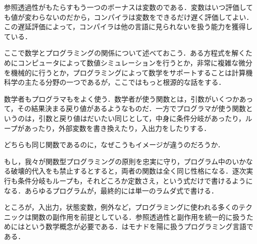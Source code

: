 \documentclass[a5paper,twoside,fleqn,draft]{jsbook}
\begin{document}
参照透過性がもたらすもう一つのボーナスは変数のである．変数はいつ評価しても値が変わらないのだから，コンパイラは変数をできるだけ遅く評価してよい．この遅延評価によって，\haskell コンパイラは他の言語に見られないを扱う能力を獲得している．

\separator

ここで数学とプログラミングの関係について述べておこう．ある方程式を解くためにコンピュータによって数値シミュレーションを行うとか，非常に複雑な微分を機械的に行うとか，プログラミングによって数学をサポートすることは計算機科学の主たる分野の一つであるが，ここではもっと根源的な話をする．

数学者もプログラマもをよく使う．数学者が使う関数とは，引数がいくつかあって，その結果決まる戻り値があるようなものだ．一方でプログラマが使う関数というのは，引数と戻り値はだいたい同じとして，中身に条件分岐があったり，ループがあったり，外部変数を書き換えたり，入出力をしたりする．

どちらも同じ関数であるのに，なぜこうもイメージが違うのだろうか．

もし，我々が関数型プログラミングの原則を忠実に守り，プログラム中のいかなる破壊的代入をも禁止するとすると，両者の関数は全く同じ性格になる．逐次実行も条件分岐もループも，それどころか定数さえ，という式だけで書けるようになる．あらゆるプログラムが，最終的には単一のラムダ式で書ける．

ところが，入出力，状態変数，例外など，プログラミングに使われる多くのテクニックは関数の副作用を前提としている．参照透過性と副作用を統一的に扱うためにはという数学概念が必要である．\haskell はモナドを陽に扱うプログラミング言語である．






\end{document}
